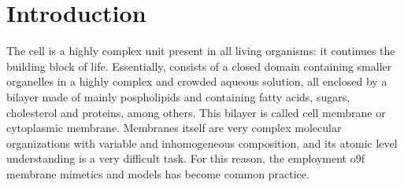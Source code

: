\documentclass[9pt]{article}
\begin{document}
\section*{}
\vspace{-1cm}








\onecolumn
\doublespacing

\thispagestyle{fancy}

\section{Introduction}
The cell is a highly complex unit present in all living organisms: it continues
the building block of life. Essentially, consists of a closed domain containing
smaller organelles in a highly complex and crowded aqueous solution, all
enclosed by a bilayer made of mainly pospholipids and containing fatty acids,
sugars, cholesterol and proteins, among others. This bilayer is called cell
membrane or cytoplasmic membrane. Membranes itself are very complex molecular
organizations with variable and inhomogeneous composition, and its atomic level
understanding is a very difficult task. For this reason, the employment o9f
membrane mimetics and models has become common practice.\\
\end{document}
